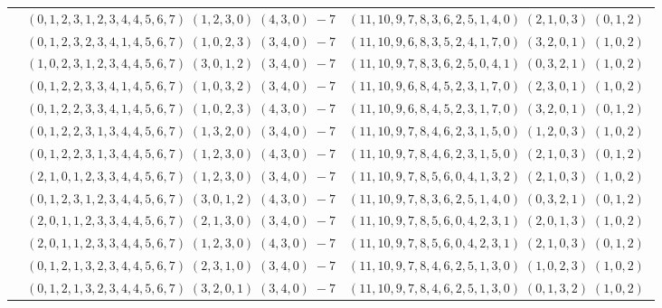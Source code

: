 \documentclass[11pt]{article}
\begin{document}
\begin{longtable}[l]{|c|c|c|}
 \cline{2-3} 
 & $(0 ,1 ,2 ,3 ,1 ,2 ,3 ,4 ,4 ,5 ,6 ,7) \;(1 ,2 ,3 ,0) \;(4 ,3 ,0) \;-7$ & $(11 ,10 ,9 ,7 ,8 ,3 ,6 ,2 ,5 ,1 ,4 ,0) \;(2 ,1 ,0 ,3) \;(0 ,1 ,2) \;$\\ 
 \cline{2-3} 
 & $(0 ,1 ,2 ,3 ,2 ,3 ,4 ,1 ,4 ,5 ,6 ,7) \;(1 ,0 ,2 ,3) \;(3 ,4 ,0) \;-7$ & $(11 ,10 ,9 ,6 ,8 ,3 ,5 ,2 ,4 ,1 ,7 ,0) \;(3 ,2 ,0 ,1) \;(1 ,0 ,2) \;$\\ 
 \cline{2-3} 
 & $(1 ,0 ,2 ,3 ,1 ,2 ,3 ,4 ,4 ,5 ,6 ,7) \;(3 ,0 ,1 ,2) \;(3 ,4 ,0) \;-7$ & $(11 ,10 ,9 ,7 ,8 ,3 ,6 ,2 ,5 ,0 ,4 ,1) \;(0 ,3 ,2 ,1) \;(1 ,0 ,2) \;$\\ 
 \cline{2-3} 
 & $(0 ,1 ,2 ,2 ,3 ,3 ,4 ,1 ,4 ,5 ,6 ,7) \;(1 ,0 ,3 ,2) \;(3 ,4 ,0) \;-7$ & $(11 ,10 ,9 ,6 ,8 ,4 ,5 ,2 ,3 ,1 ,7 ,0) \;(2 ,3 ,0 ,1) \;(1 ,0 ,2) \;$\\ 
 \cline{2-3} 
 & $(0 ,1 ,2 ,2 ,3 ,3 ,4 ,1 ,4 ,5 ,6 ,7) \;(1 ,0 ,2 ,3) \;(4 ,3 ,0) \;-7$ & $(11 ,10 ,9 ,6 ,8 ,4 ,5 ,2 ,3 ,1 ,7 ,0) \;(3 ,2 ,0 ,1) \;(0 ,1 ,2) \;$\\ 
 \cline{2-3} 
 & $(0 ,1 ,2 ,2 ,3 ,1 ,3 ,4 ,4 ,5 ,6 ,7) \;(1 ,3 ,2 ,0) \;(3 ,4 ,0) \;-7$ & $(11 ,10 ,9 ,7 ,8 ,4 ,6 ,2 ,3 ,1 ,5 ,0) \;(1 ,2 ,0 ,3) \;(1 ,0 ,2) \;$\\ 
 \cline{2-3} 
 & $(0 ,1 ,2 ,2 ,3 ,1 ,3 ,4 ,4 ,5 ,6 ,7) \;(1 ,2 ,3 ,0) \;(4 ,3 ,0) \;-7$ & $(11 ,10 ,9 ,7 ,8 ,4 ,6 ,2 ,3 ,1 ,5 ,0) \;(2 ,1 ,0 ,3) \;(0 ,1 ,2) \;$\\ 
 \cline{2-3} 
 & $(2 ,1 ,0 ,1 ,2 ,3 ,3 ,4 ,4 ,5 ,6 ,7) \;(1 ,2 ,3 ,0) \;(3 ,4 ,0) \;-7$ & $(11 ,10 ,9 ,7 ,8 ,5 ,6 ,0 ,4 ,1 ,3 ,2) \;(2 ,1 ,0 ,3) \;(1 ,0 ,2) \;$\\ 
 \cline{2-3} 
 & $(0 ,1 ,2 ,3 ,1 ,2 ,3 ,4 ,4 ,5 ,6 ,7) \;(3 ,0 ,1 ,2) \;(4 ,3 ,0) \;-7$ & $(11 ,10 ,9 ,7 ,8 ,3 ,6 ,2 ,5 ,1 ,4 ,0) \;(0 ,3 ,2 ,1) \;(0 ,1 ,2) \;$\\ 
 \cline{2-3} 
 & $(2 ,0 ,1 ,1 ,2 ,3 ,3 ,4 ,4 ,5 ,6 ,7) \;(2 ,1 ,3 ,0) \;(3 ,4 ,0) \;-7$ & $(11 ,10 ,9 ,7 ,8 ,5 ,6 ,0 ,4 ,2 ,3 ,1) \;(2 ,0 ,1 ,3) \;(1 ,0 ,2) \;$\\ 
 \cline{2-3} 
 & $(2 ,0 ,1 ,1 ,2 ,3 ,3 ,4 ,4 ,5 ,6 ,7) \;(1 ,2 ,3 ,0) \;(4 ,3 ,0) \;-7$ & $(11 ,10 ,9 ,7 ,8 ,5 ,6 ,0 ,4 ,2 ,3 ,1) \;(2 ,1 ,0 ,3) \;(0 ,1 ,2) \;$\\ 
 \cline{2-3} 
 & $(0 ,1 ,2 ,1 ,3 ,2 ,3 ,4 ,4 ,5 ,6 ,7) \;(2 ,3 ,1 ,0) \;(3 ,4 ,0) \;-7$ & $(11 ,10 ,9 ,7 ,8 ,4 ,6 ,2 ,5 ,1 ,3 ,0) \;(1 ,0 ,2 ,3) \;(1 ,0 ,2) \;$\\ 
 \cline{2-3} 
 & $(0 ,1 ,2 ,1 ,3 ,2 ,3 ,4 ,4 ,5 ,6 ,7) \;(3 ,2 ,0 ,1) \;(3 ,4 ,0) \;-7$ & $(11 ,10 ,9 ,7 ,8 ,4 ,6 ,2 ,5 ,1 ,3 ,0) \;(0 ,1 ,3 ,2) \;(1 ,0 ,2) \;$\\ 

\end{longtable}
\end{document}
